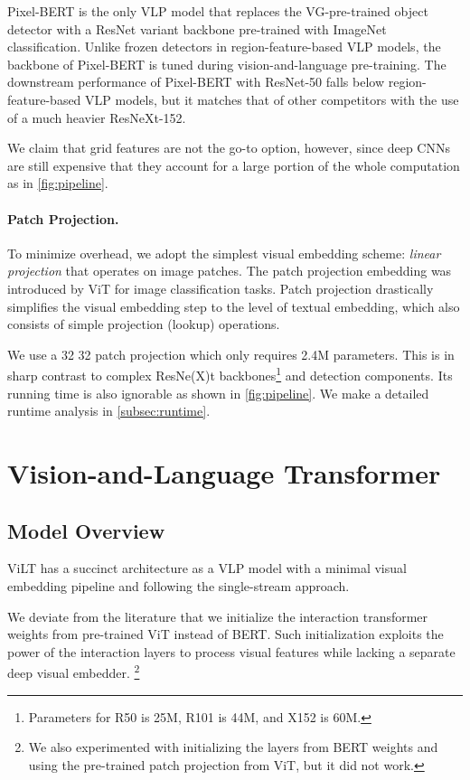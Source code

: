 \documentclass{article}
\begin{document}
Pixel-BERT is the only VLP model that replaces the VG-pre-trained object detector with a ResNet variant backbone pre-trained with ImageNet classification. Unlike frozen detectors in region-feature-based VLP models, the backbone of Pixel-BERT is tuned during vision-and-language pre-training.
The downstream performance of Pixel-BERT with ResNet-50 falls below region-feature-based VLP models, but it matches that of other competitors with the use of a much heavier ResNeXt-152.

We claim that grid features are not the go-to option, however, since deep CNNs are still expensive that they account for a large portion of the whole computation as in \cref{fig:pipeline}.

\paragraph{Patch Projection.}
To minimize overhead, we adopt the simplest visual embedding scheme: \textit{linear projection} that operates on image patches.
The patch projection embedding was introduced by ViT \citep{dosovitskiy2020image} for image classification tasks.
Patch projection drastically simplifies the visual embedding step to the level of textual embedding, which also consists of simple projection (lookup) operations.

We use a 32  32 patch projection which only requires 2.4M parameters. This is in sharp contrast to complex ResNe(X)t backbones\footnote{Parameters for R50 is 25M, R101 is 44M, and X152 is 60M.} and detection components.
Its running time is also ignorable as shown in \cref{fig:pipeline}.
We make a detailed runtime analysis in \cref{subsec:runtime}.

\section{Vision-and-Language Transformer}
\label{sec:vilt}

\subsection{Model Overview}
ViLT has a succinct architecture as a VLP model with a minimal visual embedding pipeline and following the single-stream approach.

We deviate from the literature that we initialize the interaction transformer weights from pre-trained ViT instead of BERT.
Such initialization exploits the power of the interaction layers to process visual features while lacking a separate deep visual embedder.
\footnote{We also experimented with initializing the layers from BERT weights and using the pre-trained patch projection from ViT, but it did not work.}
\end{document}
